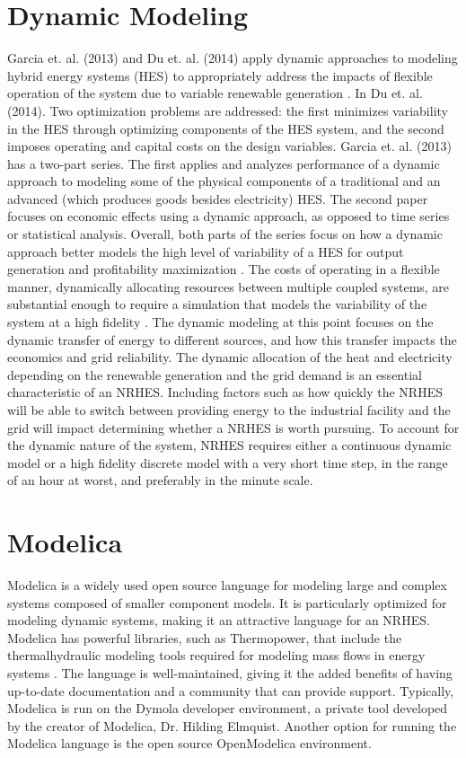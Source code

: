 \documentclass[12pt]{UIdahoMastersThesis}
\begin{document}
\section{Dynamic Modeling}
Garcia et. al. (2013) and Du et. al. (2014) apply dynamic approaches to modeling hybrid energy systems (HES) to appropriately address the impacts of flexible operation of the system due to variable renewable generation \cite{Garcia2013, Du2014}. In Du et. al. (2014). Two optimization problems are addressed: the first minimizes variability in the HES through optimizing components of the HES system, and the second imposes operating and capital costs on the design variables. Garcia et. al. (2013) has a two-part series. The first applies and analyzes performance of a dynamic approach to modeling some of the physical components of a traditional and an advanced (which produces goods besides electricity) HES. The second paper focuses on economic effects using a dynamic approach, as opposed to time series or statistical analysis. Overall, both parts of the series focus on how a dynamic approach better models the high level of variability of a HES for output generation and profitability maximization \cite{Garcia2013}. 
The costs of operating in a flexible manner, dynamically allocating resources between multiple coupled systems, are substantial enough to require a simulation that models the variability of the system at a high fidelity \cite{Garcia2013, Shropshire2011, Locatelli2015}. The dynamic modeling at this point focuses on the dynamic transfer of energy to different sources, and how this transfer impacts the economics and grid reliability. The dynamic allocation of the heat and electricity depending on the renewable generation and the grid demand is an essential characteristic of an NRHES.  Including factors such as how quickly the NRHES will be able to switch between providing energy to the industrial facility and the grid will impact determining whether a NRHES is worth pursuing.  To account for the dynamic nature of the system, NRHES requires either a continuous dynamic model or a high fidelity discrete  model with a very short time step, in the range of an hour at worst, and preferably in the minute scale.
\section{Modelica}
Modelica is a widely used open source language for modeling large and complex systems composed of smaller component models. It is particularly optimized for modeling dynamic systems, making it an attractive language for an NRHES. Modelica has powerful libraries, such as Thermopower, that include the thermalhydraulic modeling tools required for modeling mass flows in energy systems \cite{Binder2014}. The language is well-maintained, giving it the added benefits of having up-to-date documentation and a community that can provide support. Typically, Modelica is run on the Dymola developer environment, a private tool developed by the creator of Modelica, Dr. Hilding Elmquist. Another option for running the Modelica language is the open source OpenModelica environment.
\end{document}

